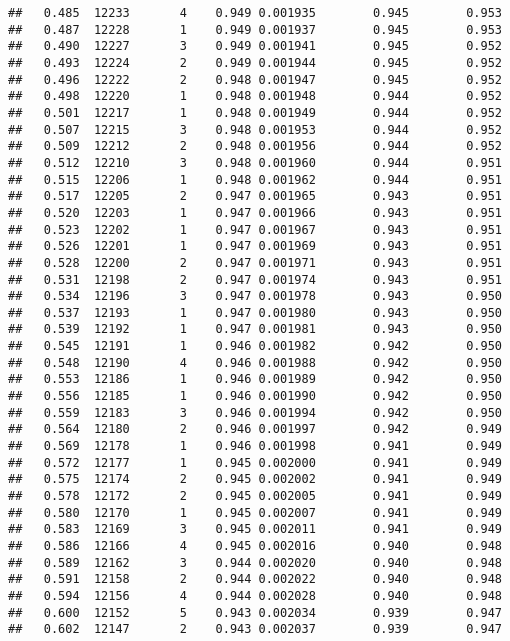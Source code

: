 \documentclass[
]{book}
\begin{document}
\begin{verbatim}
##   0.485  12233       4    0.949 0.001935        0.945        0.953
##   0.487  12228       1    0.949 0.001937        0.945        0.953
##   0.490  12227       3    0.949 0.001941        0.945        0.952
##   0.493  12224       2    0.949 0.001944        0.945        0.952
##   0.496  12222       2    0.948 0.001947        0.945        0.952
##   0.498  12220       1    0.948 0.001948        0.944        0.952
##   0.501  12217       1    0.948 0.001949        0.944        0.952
##   0.507  12215       3    0.948 0.001953        0.944        0.952
##   0.509  12212       2    0.948 0.001956        0.944        0.952
##   0.512  12210       3    0.948 0.001960        0.944        0.951
##   0.515  12206       1    0.948 0.001962        0.944        0.951
##   0.517  12205       2    0.947 0.001965        0.943        0.951
##   0.520  12203       1    0.947 0.001966        0.943        0.951
##   0.523  12202       1    0.947 0.001967        0.943        0.951
##   0.526  12201       1    0.947 0.001969        0.943        0.951
##   0.528  12200       2    0.947 0.001971        0.943        0.951
##   0.531  12198       2    0.947 0.001974        0.943        0.951
##   0.534  12196       3    0.947 0.001978        0.943        0.950
##   0.537  12193       1    0.947 0.001980        0.943        0.950
##   0.539  12192       1    0.947 0.001981        0.943        0.950
##   0.545  12191       1    0.946 0.001982        0.942        0.950
##   0.548  12190       4    0.946 0.001988        0.942        0.950
##   0.553  12186       1    0.946 0.001989        0.942        0.950
##   0.556  12185       1    0.946 0.001990        0.942        0.950
##   0.559  12183       3    0.946 0.001994        0.942        0.950
##   0.564  12180       2    0.946 0.001997        0.942        0.949
##   0.569  12178       1    0.946 0.001998        0.941        0.949
##   0.572  12177       1    0.945 0.002000        0.941        0.949
##   0.575  12174       2    0.945 0.002002        0.941        0.949
##   0.578  12172       2    0.945 0.002005        0.941        0.949
##   0.580  12170       1    0.945 0.002007        0.941        0.949
##   0.583  12169       3    0.945 0.002011        0.941        0.949
##   0.586  12166       4    0.945 0.002016        0.940        0.948
##   0.589  12162       3    0.944 0.002020        0.940        0.948
##   0.591  12158       2    0.944 0.002022        0.940        0.948
##   0.594  12156       4    0.944 0.002028        0.940        0.948
##   0.600  12152       5    0.943 0.002034        0.939        0.947
##   0.602  12147       2    0.943 0.002037        0.939        0.947

\end{verbatim}
\end{document}
